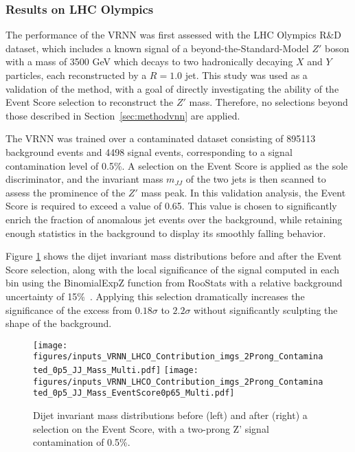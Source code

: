\documentclass[a4paper,11pt]{article}
\begin{document}
\subsubsection{Results on LHC Olympics}
\label{sec:results}



The performance of the VRNN was first assessed with the LHC Olympics R\&D dataset, which includes a known signal of a beyond-the-Standard-Model $Z'$ boson with a mass of 3500 GeV which decays to two hadronically decaying $X$ and $Y$ particles, each reconstructed by a $R=1.0$ jet.
This study was used as a validation of the method, with a goal of directly investigating the ability of the Event Score selection to reconstruct the $Z'$ mass. 
Therefore, no selections beyond those described in Section~\ref{sec:methodvnn} are applied.


The VRNN was trained over a contaminated dataset consisting of 895113 background events and 4498 signal events, corresponding to a signal contamination level of 0.5\%.
A selection on the Event Score is applied as the sole discriminator, and the invariant mass $m_{JJ}$ of the two jets is then scanned to assess the prominence of the $Z'$ mass peak.
In this validation analysis, the Event Score is required to exceed a value of 0.65. 
This value is chosen to significantly enrich the fraction of anomalous jet events over the background, while retaining enough statistics in the background to display its smoothly falling behavior.

Figure \ref{fig:m_JJ} shows the dijet invariant mass distributions before and after the Event Score selection, along with the local significance of the signal computed in each bin using the {\sc BinomialExpZ} function from {\sc RooStats} with a relative background uncertainty of 15\%~\cite{moneta2011roostats}.
Applying this selection dramatically increases the significance of the excess from $0.18\sigma$ to $2.2\sigma$ without significantly sculpting the shape of the background.


\begin{figure}[h!]
	\begin{center}
		\texttt{[image: figures/inputs\_VRNN\_LHCO\_Contribution\_imgs\_2Prong\_Contaminated\_0p5\_JJ\_Mass\_Multi.pdf]}
		\texttt{[image: figures/inputs\_VRNN\_LHCO\_Contribution\_imgs\_2Prong\_Contaminated\_0p5\_JJ\_Mass\_EventScore0p65\_Multi.pdf]}
	\end{center}
	\caption{Dijet invariant mass distributions before (left) and after (right) a selection on the Event Score, with a two-prong Z' signal contamination of 0.5\%.}
	\label{fig:m_JJ}
\end{figure}
\end{document}
